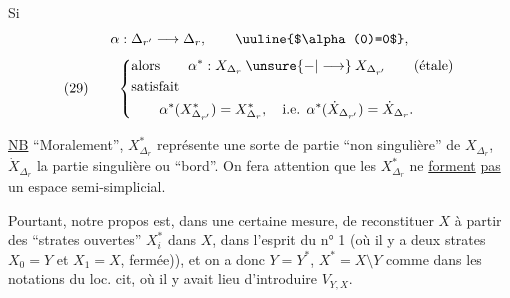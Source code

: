 Si
\[
\alpha:\Delta_{r'}\longrightarrow\Delta_r,\qquad \uuline{$\alpha(0)=0$},
\]
\[
(29)\qquad\left\{\begin{aligned}
&\text{alors}\qquad \alpha^*:X_{\Delta_r}\mathbin{\unsure{-|\longrightarrow}}X_{\Delta_{r'}}\qquad(\text{étale})\\
&\text{satisfait}\\
&\qquad\alpha^*(X_{\Delta_{r'}}^*)=X_{\Delta_r}^*,\quad\text{i.e. }\alpha^*(\dot X_{\Delta_{r'}})=\dot X_{\Delta_r}.
\end{aligned}\right.
\]


\uline{NB} ``Moralement'', $X_{\Delta_r}^*$ représente une sorte de partie ``non singulière'' de $X_{\Delta_r}$, $\dot X_{\Delta_r}$ la partie singulière ou ``bord''. On fera attention que les $X_{\Delta_r}^*$ ne \uline{forment} \uline{pas} un espace semi-simplicial.

Pourtant, notre propos est, dans une certaine mesure, de reconstituer $X$ à partir des ``strates ouvertes'' $X_i^*$ dans $X$, dans l'esprit du n° 1 (où il y a deux strates $X_0=Y$ et $X_1=X$,   fermée)), et on a donc $Y=Y^*$, $X^*=X\setminus Y$ comme dans les notations du loc. cit, où il y avait lieu d'introduire $V_{Y,X}$.
